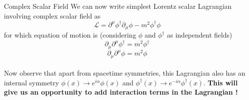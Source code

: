 \documentclass{beamer}
\begin{document}
\begin{frame}{Complex Scalar Field}
    We can now write simplest Lorentz scalar Lagrangian involving complex scalar field as
    \begin{equation}
        \mathcal{L} = \partial^{\mu}\phi^{\dagger}\partial_{\mu}\phi  - m^{2}\phi^{\dagger}\phi
    \end{equation} for which equation of motion is (considering $\phi$ and $\phi^{\dagger}$ as independent fields)
    \begin{equation}
        \partial_{\mu}\partial^{\mu}\phi^{\dagger} = m^{2}\phi^{\dagger}
    \end{equation}
    \begin{equation}
        \partial_{\mu}\partial^{\mu}\phi = m^{2}\phi
    \end{equation} \\
    \vspace{5mm}
    Now observe that apart from spacetime symmetries, this Lagrangian also has an internal symmetry $\phi(x) \to e^{i\alpha}\phi(x)$ and $\phi^{\dagger}(x)\to e^{-i\alpha}\phi^{\dagger}(x)$. \textbf{This will give us an opportunity to add interaction terms in the Lagrangian !}
\end{frame}

\end{document}
